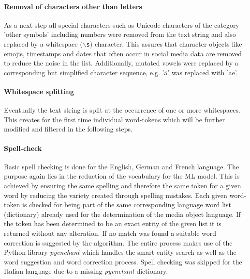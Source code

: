 \paragraph*{Removal of characters other than letters} \label{remove_eveything_but_letters}
As a next step all special characters such as Unicode characters of the category 'other symbols' including numbers were removed from the text string and also replaced by a whitespace (\texttt{$\backslash$s}) character. This assures that character objects like emojis, timestamps and dates that often occur in social media data are removed to reduce the noise in the list. Additionally, mutated vowels were replaced by a corresponding but simplified character sequence, e.g. '\"a' was replaced with 'ae'.

\paragraph*{Whitespace splitting} \label{whitespace_splitting}
Eventually the text string is split at the occurrence of one or more whitespaces. This creates for the first time individual word-tokens which will be further modified and filtered in the following steps.

\paragraph*{Spell-check} \label{spell_check}
Basic spell checking is done for the English, German and French language. The purpose again lies in the reduction of the vocabulary for the ML model. This is achieved by ensuring the same spelling and therefore the same token for a given word by reducing the variety created through spelling mistakes. Each given word-token is checked for being part of the same corresponding language word list (dictionary) already used for the determination of the media object language. If the token has been determined to be an exact entity of the given list it is returned without any alteration. If no match was found a suitable word correction is suggested by the algorithm. The entire process makes use of the Python library \textit{pyenchant} which handles the smart entity search as well as the word suggestion and word correction process. Spell checking was skipped for the Italian language due to a missing \textit{pyenchant} dictionary.

